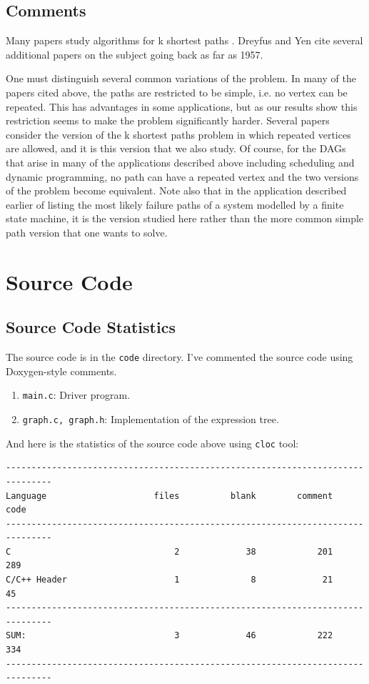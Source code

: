 \documentclass[a4paper,oneside]{book}
\begin{document}
\section{Comments}

Many papers study algorithms for k shortest paths \cite{doi:10.1137/S0097539795290477}. Dreyfus and Yen \cite{6d707c5e-cd30-3994-a0f9-2e2fa3dfc631} cite several additional papers on the subject going back as far as 1957.

One must distinguish several common variations of the problem. In many of the papers cited above, the paths are restricted to be simple, i.e. no vertex can be repeated. This has advantages in some applications, but as our results show this restriction seems to make the problem significantly harder. Several papers \cite{doi:10.1137/S0097539795290477} consider the version of the k shortest paths problem in which repeated vertices are allowed, and it is this version that we also study. Of course, for the DAGs that arise in many of the applications described above including scheduling and dynamic programming, no path can have a repeated vertex and the two versions of the problem become equivalent. Note also that in the application described earlier of listing the most likely failure paths of a system modelled by a finite state machine, it is the version studied here rather than the more common simple path version that one wants to solve.

\appendix

\chapter{Source Code}

\section{Source Code Statistics}

The source code is in the \verb|code| directory. I've commented the source code
using Doxygen-style comments.

\begin{enumerate}
    \item \verb|main.c|: Driver program.
    \item \verb|graph.c, graph.h|: Implementation of the expression tree.
\end{enumerate}

And here is the statistics of the source code above using \verb|cloc| tool:

\begin{verbatim}
-------------------------------------------------------------------------------
Language                     files          blank        comment           code
-------------------------------------------------------------------------------
C                                2             38            201            289
C/C++ Header                     1              8             21             45
-------------------------------------------------------------------------------
SUM:                             3             46            222            334
-------------------------------------------------------------------------------
\end{verbatim}
\end{document}
